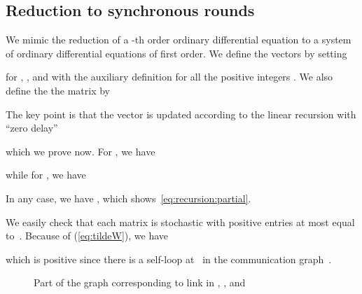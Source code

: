 \documentclass[a4paper]{article}
\theoremstyle{newthm}
\begin{document}
\subsection{Reduction to synchronous rounds}\label{sec:red}

We mimic the  reduction of a -th order ordinary differential
	equation to a system of  ordinary differential equations of first order.	
We define the vectors  by setting
	
	for ,  , and with the auxiliary definition  for all
	the positive integers .
We also define the  the  matrix  
	 by
		
The key point is  that  the vector  is updated according to the linear
	recursion with ``zero delay'' 
	
	 which we prove now.
For , we have

while
for , we have

In any case, we have , 
	which shows~\eqref{eq:recursion:partial}.

We easily check that each matrix  is stochastic  with positive entries 
	 at most equal to~.
Because of (\ref{eq:tildeW}), we have 
	
	which is positive since there is a self-loop at~ in the communication graph~.

\begin{figure}
\centering
{}
\caption{Part of the graph  corresponding to link  in , 
	, and }
\label{fig:delay:reduction}
\end{figure}
\end{document}
